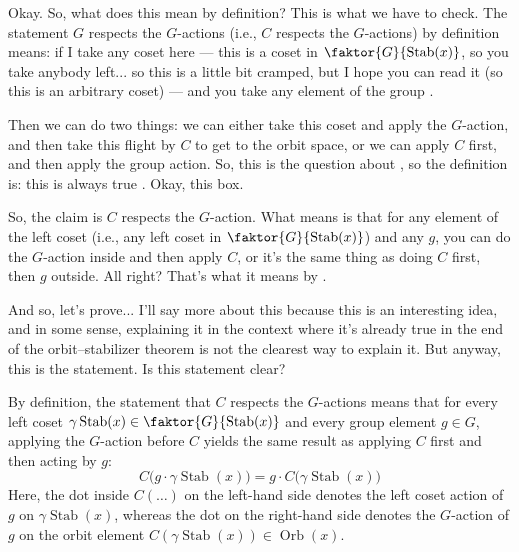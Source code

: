 \begin{speech}[00:16:01 - 00:17:55]
Okay. So, what does this mean by definition? This is what we have to check. The statement $G$ respects the $G$-actions (i.e., $C$ respects the $G$-actions) by definition means: if I take any coset here --- this is a coset in $\faktor{G}{\operatorname{Stab}(x)}$, so you take anybody left... so this is a little bit cramped, but I hope you can read it (so this is an arbitrary coset) --- and you take any element of the group .

Then we can do two things: we can either take this coset and apply the $G$-action, and then take this flight by $C$ to get to the orbit space, or we can apply $C$ first, and then apply the group action. So, this is the question about , so the definition is: this is always true . Okay, this box.

So, the claim is $C$ respects the $G$-action. What  means is that for any element of the left coset (i.e., any left coset in $\faktor{G}{\operatorname{Stab}(x)}$) and any $g$, you can do the $G$-action inside and then apply $C$, or it's the same thing as doing $C$ first, then $g$ outside. All right? That's what it means by .

And so, let's prove... I'll say more about this because this is an interesting idea, and in some sense, explaining it in the context where it's already true in the end of the orbit--stabilizer theorem is not the clearest way to explain it. But anyway, this is the statement. Is this statement clear?
\end{speech}

\begin{content}
By definition, the statement that $C$ respects the $G$-actions means that for every left coset $\gamma \operatorname{Stab}(x) \in \faktor{G}{\operatorname{Stab}(x)}$ and every group element $g \in G$, applying the $G$-action before $C$ yields the same result as applying $C$ first and then acting by $g$:
\begin{equation}\label{eq:equivariance-goal}
\boxed{C\bigl(g \cdot \gamma \operatorname{Stab}(x)\bigr) = g \cdot C\bigl(\gamma \operatorname{Stab}(x)\bigr)}
\end{equation}
Here, the dot inside $C(\dots)$ on the left-hand side denotes the left coset action of $g$ on $\gamma \operatorname{Stab}(x)$, whereas the dot on the right-hand side denotes the $G$-action of $g$ on the orbit element $C(\gamma \operatorname{Stab}(x)) \in \operatorname{Orb}(x)$.
\end{content}

